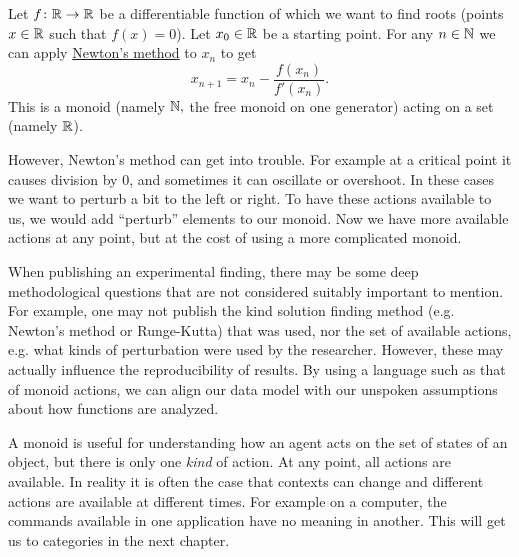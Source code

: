 \documentclass[CT4S-EN-RU]{subfiles}
\begin{document}
\begin{exerciseRUS}
\end{exerciseRUS}

\begin{applicationENG}
Let $f\colon{\mathbb R}\rightarrow{\mathbb R}$ be a differentiable function of which we want to find roots (points $x\in{\mathbb R}$ such that $f(x)=0$). Let $x_0\in{\mathbb R}$ be a starting point. For any $n\in{\mathbb N}$ we can apply \href{http://en.wikipedia.org/wiki/Newton's_method}{\text Newton's method} to $x_n$ to get $$x_{n+1}=x_n-\frac{f(x_n)}{f'(x_n)}.$$
This is a monoid (namely ${\mathbb N},$ the free monoid on one generator) acting on a set (namely ${\mathbb R}$).

However, Newton's method can get into trouble. For example at a critical point it causes division by 0, and sometimes it can oscillate or overshoot. In these cases we want to perturb a bit to the left or right. To have these actions available to us, we would add “perturb” elements to our monoid. Now we have more available actions at any point, but at the cost of using a more complicated monoid.

When publishing an experimental finding, there may be some deep methodological questions that are not considered suitably important to mention. For example, one may not publish the kind solution finding method (e.g. Newton's method or Runge-Kutta) that was used, nor the set of available actions, e.g. what kinds of perturbation were used by the researcher. However, these may actually influence the reproducibility of results. By using a language such as that of monoid actions, we can align our data model with our unspoken assumptions about how functions are analyzed.
\end{applicationENG}

\begin{applicationRUS}
\end{applicationRUS}

\begin{remarkENG}
A monoid is useful for understanding how an agent acts on the set of states of an object, but there is only one {\em kind} of action. At any point, all actions are available. In reality it is often the case that contexts can change and different actions are available at different times. For example on a computer, the commands available in one application have no meaning in another. This will get us to categories in the next chapter.
\end{remarkENG}

\begin{remarkRUS}
\end{remarkRUS}
\end{document}
